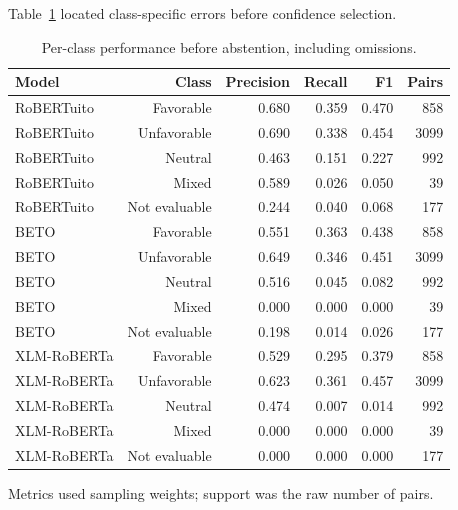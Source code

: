 \documentclass[11pt,a4paper]{article}
\begin{document}
Table~\ref{tab:supp_classes} located class-specific errors before confidence selection.

\begin{table}[H]\centering\small
\caption{Per-class performance before abstention, including omissions.}
\label{tab:supp_classes}
\setlength{\tabcolsep}{4pt}
\begin{tabular}{lrrrrr}\toprule
Model & Class & Precision & Recall & F1 & Pairs\\\midrule
RoBERTuito & Favorable & 0.680 & 0.359 & 0.470 & 858\\
RoBERTuito & Unfavorable & 0.690 & 0.338 & 0.454 & 3099\\
RoBERTuito & Neutral & 0.463 & 0.151 & 0.227 & 992\\
RoBERTuito & Mixed & 0.589 & 0.026 & 0.050 & 39\\
RoBERTuito & Not evaluable & 0.244 & 0.040 & 0.068 & 177\\
BETO & Favorable & 0.551 & 0.363 & 0.438 & 858\\
BETO & Unfavorable & 0.649 & 0.346 & 0.451 & 3099\\
BETO & Neutral & 0.516 & 0.045 & 0.082 & 992\\
BETO & Mixed & 0.000 & 0.000 & 0.000 & 39\\
BETO & Not evaluable & 0.198 & 0.014 & 0.026 & 177\\
XLM-RoBERTa & Favorable & 0.529 & 0.295 & 0.379 & 858\\
XLM-RoBERTa & Unfavorable & 0.623 & 0.361 & 0.457 & 3099\\
XLM-RoBERTa & Neutral & 0.474 & 0.007 & 0.014 & 992\\
XLM-RoBERTa & Mixed & 0.000 & 0.000 & 0.000 & 39\\
XLM-RoBERTa & Not evaluable & 0.000 & 0.000 & 0.000 & 177\\
\bottomrule\end{tabular}
\par\smallskip\footnotesize Metrics used sampling weights; support was the raw number of pairs.
\end{table}
\end{document}
